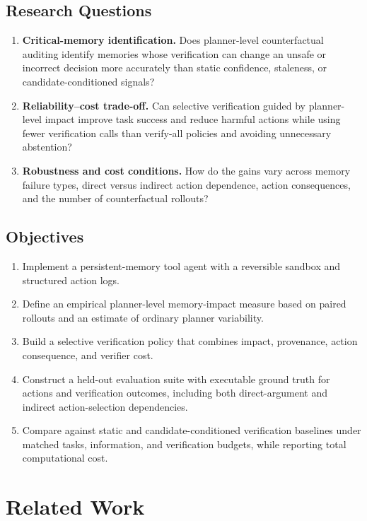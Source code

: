 \documentclass[11pt]{article}
\begin{document}
\subsection{Research Questions}

\begin{enumerate}[label=\textbf{RQ\arabic*:},leftmargin=3.2em]
  \item \textbf{Critical-memory identification.} Does planner-level counterfactual auditing identify memories whose verification can change an unsafe or incorrect decision more accurately than static confidence, staleness, or candidate-conditioned signals?
  \item \textbf{Reliability--cost trade-off.} Can selective verification guided by planner-level impact improve task success and reduce harmful actions while using fewer verification calls than verify-all policies and avoiding unnecessary abstention?
  \item \textbf{Robustness and cost conditions.} How do the gains vary across memory failure types, direct versus indirect action dependence, action consequences, and the number of counterfactual rollouts?
\end{enumerate}

\subsection{Objectives}

\begin{enumerate}
  \item Implement a persistent-memory tool agent with a reversible sandbox and structured action logs.
  \item Define an empirical planner-level memory-impact measure based on paired rollouts and an estimate of ordinary planner variability.
  \item Build a selective verification policy that combines impact, provenance, action consequence, and verifier cost.
  \item Construct a held-out evaluation suite with executable ground truth for actions and verification outcomes, including both direct-argument and indirect action-selection dependencies.
  \item Compare against static and candidate-conditioned verification baselines under matched tasks, information, and verification budgets, while reporting total computational cost.
\end{enumerate}

\section{Related Work}
\end{document}

